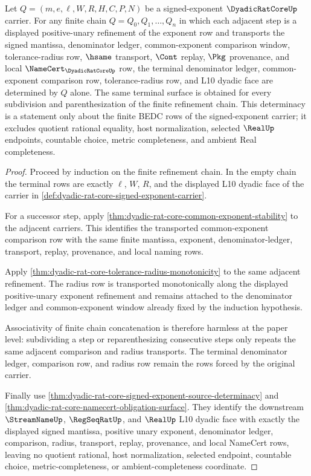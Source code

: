 \begin{theorem}
\label{thm:dyadicratcore-signed-exponent-denominator-chain-determinacy}
Let $Q=(m,e,\ell,W,R,H,C,P,N)$ be a signed-exponent $\DyadicRatCoreUp$ carrier. For any finite chain $Q=Q_0,Q_1,\ldots,Q_n$ in which each adjacent step is a displayed positive-unary refinement of the exponent row and transports the signed mantissa, denominator ledger, common-exponent comparison window, tolerance-radius row, $\hsame$ transport, $\Cont$ replay, $\Pkg$ provenance, and local $\NameCert_{\DyadicRatCoreUp}$ row, the terminal denominator ledger, common-exponent comparison row, tolerance-radius row, and L10 dyadic face are determined by $Q$ alone. The same terminal surface is obtained for every subdivision and parenthesization of the finite refinement chain. This determinacy is a statement only about the finite BEDC rows of the signed-exponent carrier; it excludes quotient rational equality, host normalization, selected $\RealUp$ endpoints, countable choice, metric completeness, and ambient Real completeness.
\end{theorem}
\begin{proof}
Proceed by induction on the finite refinement chain. In the empty chain the terminal rows are exactly $\ell$, $W$, $R$, and the displayed L10 dyadic face of the carrier in \autoref{def:dyadic-rat-core-signed-exponent-carrier}.

For a successor step, apply \autoref{thm:dyadic-rat-core-common-exponent-stability} to the adjacent carriers. This identifies the transported common-exponent comparison row with the same finite mantissa, exponent, denominator-ledger, transport, replay, provenance, and local naming rows.

Apply \autoref{thm:dyadic-rat-core-tolerance-radius-monotonicity} to the same adjacent refinement. The radius row is transported monotonically along the displayed positive-unary exponent refinement and remains attached to the denominator ledger and common-exponent window already fixed by the induction hypothesis.

Associativity of finite chain concatenation is therefore harmless at the paper level: subdividing a step or reparenthesizing consecutive steps only repeats the same adjacent comparison and radius transports. The terminal denominator ledger, comparison row, and radius row remain the rows forced by the original carrier.

Finally use \autoref{thm:dyadic-rat-core-signed-exponent-source-determinacy} and \autoref{thm:dyadic-rat-core-namecert-obligation-surface}. They identify the downstream $\StreamNameUp$, $\RegSeqRatUp$, and $\RealUp$ L10 dyadic face with exactly the displayed signed mantissa, positive unary exponent, denominator ledger, comparison, radius, transport, replay, provenance, and local NameCert rows, leaving no quotient rational, host normalization, selected endpoint, countable choice, metric-completeness, or ambient-completeness coordinate.
\end{proof}

